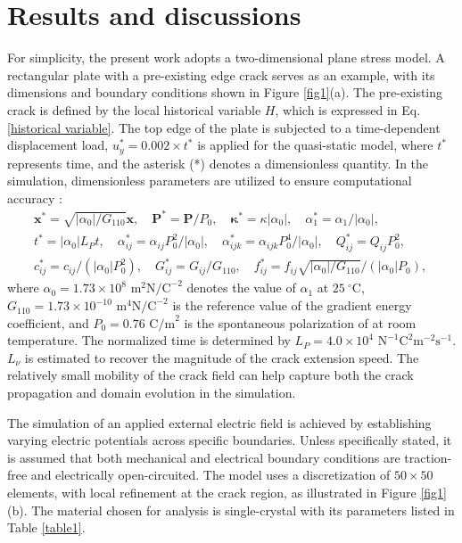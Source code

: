 \documentclass[times,fleqn,11pt]{elsarticle}
\begin{document}
\section{Results and discussions}\label{Section4}
For simplicity, the present work adopts a two-dimensional plane stress model. A rectangular plate with a pre-existing edge crack serves as an example, with its dimensions and boundary conditions shown in Figure \ref{fig1}(a). The pre-existing crack is defined by the local historical variable $H$, which is expressed in Eq.\eqref{historical variable}. The top edge of the plate is subjected to a time-dependent displacement load, $u_y^*=0. 002\times t^*$ is applied for the quasi-static model, where $t^*$ represents time, and the asterisk (*) denotes a dimensionless quantity. In the simulation, dimensionless parameters are utilized to ensure computational accuracy \cite{chang_liu_isogeometric_2019}:
\begin{equation}
    \begin{split}
        & \mathbf{x}^*=\sqrt{|\alpha_0|/G_{110}}\mathbf{x}, \quad
        \mathbf{P}^*=\mathbf{P}/{P_0}, \quad
        \mathbf{\kappa^*}=\kappa |\alpha_0|, \quad
        \alpha_1^*=\alpha_1/|\alpha_0|, \quad \\
        & t^*=|\alpha_0 | L_P t, \quad
         \alpha_{ij}^*=\alpha_{ij}P_0^2/|\alpha_0|, \quad
        \alpha_{ijk}^*=\alpha_{ijk}P_0^4/|\alpha_0|, \quad
        Q_{ij}^*=Q_{ij}P_0^2, \quad \\
       &c_{ij}^*=c_{ij}/(|\alpha_0|P_0^2),\quad
        G_{ij}^*=G_{ij}/G_{110}, \quad
       f_{ij}^*=f_{ij}\sqrt{|\alpha_0|/G_{110}}/(|\alpha_0| P_0), \quad
    \end{split}
\end{equation}
where $\alpha_0=1.73\times 10^8$ $\text{m}^2 \text{N/C}^{-2}$ denotes the value of $\alpha_1$ at $25 ~^\circ $C, $G_{110}= 1.73\times 10^{-10}$ $\text{m}^4 \text{N/C}^{-2}$ is the reference value of the gradient energy coefficient, and $P_0=0.76$ $\text{C/m}^{2}$  is the spontaneous polarization of  at room temperature. The normalized time is determined by $L_P=4.0\times10^4$ $\text{N}^{-1}\text{C}^2\text{m}^{-2}\text{s}^{-1}$. $L_\nu$ is estimated to recover the magnitude of the crack extension speed. The relatively small mobility of the crack field can help capture both the crack propagation and domain evolution in the simulation\cite{abdollahi_phase-field_2011,abdollahi_phase-field_2012}.

The simulation of an applied external electric field is achieved by establishing varying electric potentials across specific boundaries.  Unless specifically stated, it is assumed that both mechanical and electrical boundary conditions are traction-free and electrically open-circuited. The model uses a discretization of $50 \times 50$ elements, with local refinement at the crack region, as illustrated in Figure \ref{fig1}(b).  The material chosen for analysis is single-crystal  with its parameters listed in Table \ref{table1}. 
 
\end{document}
